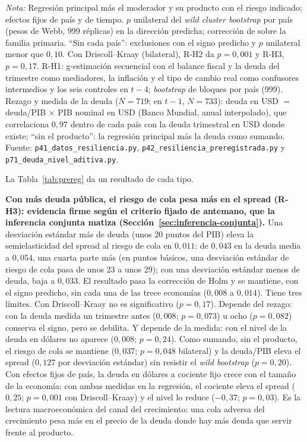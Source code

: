 \begin{table}[htbp]
\par\smallskip\parbox{0.95\linewidth}{\footnotesize \textit{Nota:} Regresión principal más el moderador y su producto con el riesgo indicado; efectos fijos de país y de tiempo. $p$ unilateral del \textit{wild cluster bootstrap} por país (pesos de Webb, 999 réplicas) en la dirección predicha; corrección de \citet{Holm1979} sobre la familia primaria. ``Sin cada país'': exclusiones con el signo predicho y $p$ unilateral menor que $0{,}10$. Con Driscoll--Kraay (bilateral), R-H2 da $p=0{,}001$ y R-H3, $p=0{,}17$. R-H1: g-estimación secuencial con el balance fiscal y la deuda del trimestre como mediadores, la inflación y el tipo de cambio real como confusores intermedios y los seis controles en $t-4$; \textit{bootstrap} de bloques por país (999). Rezago y medida de la deuda ($N=719$; en $t-1$, $N=733$): deuda en USD $=$ deuda/PIB $\times$ PIB nominal en USD (Banco Mundial, anual interpolado), que correlaciona $0{,}97$ dentro de cada país con la deuda trimestral en USD donde existe; ``sin el producto'': la regresión principal más la deuda como sumando. Fuente: \texttt{p41\_datos\_resiliencia.py}, \texttt{p42\_resiliencia\_preregistrada.py} y \texttt{p71\_deuda\_nivel\_aditiva.py}.}
\end{table}

La Tabla~\ref{tab:prereg} da un resultado de cada tipo.

\textbf{Con más deuda pública, el riesgo de cola pesa más en el spread (R-H3): evidencia firme según el criterio fijado de antemano, que la inferencia conjunta matiza (Sección~\ref{sec:inferencia-conjunta}).} Una desviación estándar más de deuda (unos 20 puntos del PIB) eleva la semielasticidad del spread al riesgo de cola en $0{,}011$: de $0{,}043$ en la deuda media a $0{,}054$, una cuarta parte más (en puntos básicos, una desviación estándar de riesgo de cola pasa de unos 23 a unos 29); con una desviación estándar menos de deuda, baja a $0{,}033$. El resultado pasa la corrección de Holm y se mantiene, con el signo predicho, sin cada una de las trece economías ($0{,}008$ a $0{,}014$). Tiene tres límites. Con Driscoll--Kraay no es significativo ($p=0{,}17$). Depende del rezago: con la deuda medida un trimestre antes ($0{,}008$; $p=0{,}073$) u ocho ($p=0{,}082$) conserva el signo, pero se debilita. Y depende de la medida: con el nivel de la deuda en dólares no aparece ($0{,}008$; $p=0{,}24$). Como sumando, sin el producto, el riesgo de cola se mantiene ($0{,}037$; $p=0{,}048$ bilateral) y la deuda/PIB eleva el spread ($0{,}127$ por desviación estándar) sin resistir el \textit{wild bootstrap} ($p=0{,}20$). Con efectos fijos de país, la deuda en dólares a cociente fijo crece con el tamaño de la economía: con ambas medidas en la regresión, el cociente eleva el spread ($0{,}25$; $p=0{,}001$ con Driscoll--Kraay) y el nivel lo reduce ($-0{,}37$; $p=0{,}03$). Es la lectura macroeconómica del canal del crecimiento: una cola adversa del crecimiento pesa más en el precio de la deuda donde hay más deuda que servir frente al producto.

